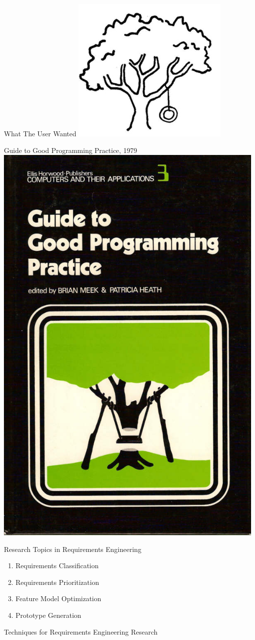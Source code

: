 \documentclass{beamer}
\begin{document}
\begin{frame}[t]{What The User Wanted}
    \includegraphics[width=.4\textwidth]{treecust.jpg}
\end{frame}

\begin{frame}[t]{Guide to Good Programming Practice, 1979}
    \includegraphics[width=.4\textwidth]{treeswing_computer_book_cover.jpg}
\end{frame}

\begin{frame}[t]{Research Topics in Requirements Engineering}
    \begin{enumerate}
        \item Requirements Classification
        \item Requirements Prioritization
        \item Feature Model Optimization
        \item Prototype Generation
    \end{enumerate}
\end{frame}

\begin{frame}[t]{Techniques for Requirements Engineering Research}
\end{frame}
\end{document}
